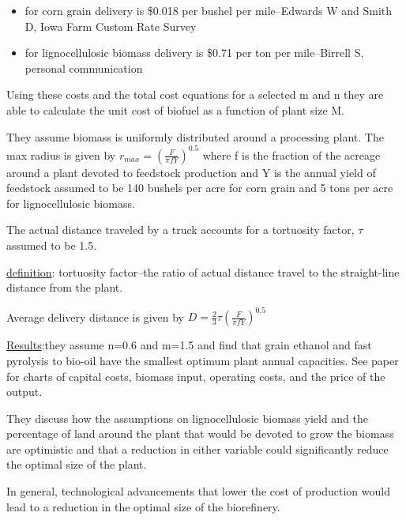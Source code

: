 \documentclass{article}\usepackage[]{graphicx}\usepackage[]{color}
\begin{document}
\begin{itemize}
\item for corn grain delivery is \$0.018 per bushel per mile--Edwards W and Smith D, Iowa Farm Custom Rate Survey
\item for lignocellulosic biomass delivery is \$0.71 per ton per mile--Birrell S, personal communication
\end{itemize}

Using these costs and the total cost equations for a selected m and n they are able to calculate the unit cost of biofuel as a function of plant size M.

They assume biomass is uniformly distributed around a processing plant.  The max radius is given by $r_{max} = (\frac{F}{\pi f Y})^{0.5}$ where f is the fraction of the acreage around a plant devoted to feedstock production and Y is the annual yield of feedstock assumed to be 140 bushels per acre for corn grain and 5 tons per acre for lignocellulosic biomass.

The actual distance traveled by a truck accounts for a tortuosity factor, $\tau$ assumed to be 1.5.

\underline{definition}: tortuosity factor--the ratio of actual distance travel to the straight-line distance from the plant.

Average delivery distance is given by $D=\frac{2}{3} \tau (\frac{F}{\pi f Y})^{0.5}$

\underline{Results}:they assume n=0.6 and m=1.5 and find that grain ethanol and fast pyrolysis to bio-oil have the smallest optimum plant annual capacities.  See paper for charts of capital costs, biomass input, operating costs, and the price of the output.

They discuss how the assumptions on lignocellulosic biomass yield and the percentage of land around the plant that would be devoted to grow the biomass are optimistic and that a reduction in either variable could significantly reduce the optimal size of the plant.

In general, technological advancements that lower the cost of production would lead to a reduction in the optimal size of the biorefinery.
\end{document}
